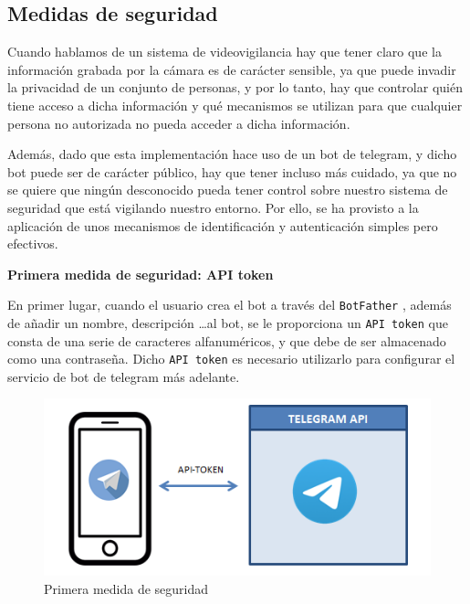 


\pagestyle{miEstilo504}


\subsection{Medidas de seguridad}

Cuando hablamos de un sistema de videovigilancia hay que tener claro que la información grabada por la cámara es de carácter sensible, ya que puede invadir la privacidad de un conjunto de personas, y por lo tanto, hay que controlar quién tiene acceso a dicha información y qué mecanismos se utilizan para que cualquier persona no autorizada no pueda acceder a dicha información.

Además, dado que esta implementación hace uso de un bot de telegram, y dicho bot puede ser de carácter público, hay que tener incluso más cuidado, ya que no se quiere que ningún desconocido pueda tener control sobre nuestro sistema de seguridad que está vigilando nuestro entorno. Por ello, se ha provisto a la aplicación de unos mecanismos de identificación y autenticación simples pero efectivos.

\textbf{Primera medida de seguridad: API token}

En primer lugar, cuando el usuario crea el bot a través del \texttt{BotFather} \cite{ref31}, además de añadir un nombre, descripción \ldots al bot, se le proporciona un \texttt{API token} que consta de una serie de caracteres alfanuméricos, y que debe de ser almacenado como una contraseña. Dicho \texttt{API token} es necesario utilizarlo para configurar el servicio de bot de telegram más adelante. 


\begin{figure}[h]
	\centering
	\includegraphics[scale=0.35]{images/36}
	\caption{Primera medida de seguridad}
	\label{img:seg1}
\end{figure}

